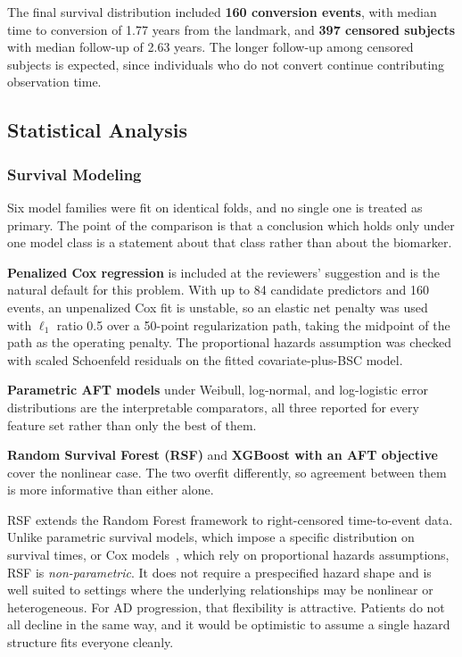 \documentclass[blue]{ludusofficial}  %
\begin{document}
The final survival distribution included \textbf{160 conversion events}, with median time to conversion of 1.77 years from the landmark, and \textbf{397 censored subjects} with median follow-up of 2.63 years. The longer follow-up among censored subjects is expected, since individuals who do not convert continue contributing observation time.

\subsection{Statistical Analysis}

\subsubsection{Survival Modeling}

Six model families were fit on identical folds, and no single one is treated as primary. The point of the comparison is that a conclusion which holds only under one model class is a statement about that class rather than about the biomarker.

\textbf{Penalized Cox regression} is included at the reviewers' suggestion and is the natural default for this problem. With up to 84 candidate predictors and 160 events, an unpenalized Cox fit is unstable, so an elastic net penalty was used~\cite{simon2011regularization,cox1972} with $\ell_1$ ratio 0.5 over a 50-point regularization path, taking the midpoint of the path as the operating penalty. The proportional hazards assumption was checked with scaled Schoenfeld residuals on the fitted covariate-plus-BSC model.

\textbf{Parametric AFT models} under Weibull, log-normal, and log-logistic error distributions are the interpretable comparators, all three reported for every feature set rather than only the best of them.

\textbf{Random Survival Forest (RSF)} and \textbf{XGBoost with an AFT objective}~\cite{chen2016xgboost,barnwal2022survivalxgb} cover the nonlinear case. The two overfit differently, so agreement between them is more informative than either alone.

RSF extends the Random Forest framework to right-censored time-to-event data. Unlike parametric survival models, which impose a specific distribution on survival times, or Cox models~\cite{cox1972}, which rely on proportional hazards assumptions, RSF is \textit{non-parametric}. It does not require a prespecified hazard shape and is well suited to settings where the underlying relationships may be nonlinear or heterogeneous. For AD progression, that flexibility is attractive. Patients do not all decline in the same way, and it would be optimistic to assume a single hazard structure fits everyone cleanly.
\end{document}
